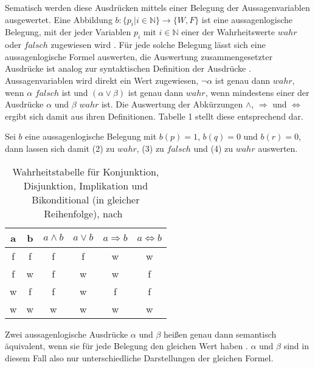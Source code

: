 \documentclass[conference,compsoc,final,a4paper]{IEEEtran}
\begin{document}
Sematisch werden diese Ausdrücken mittels einer Belegung der Aussagenvariablen ausgewertet. Eine Abbildung $b: \{ p_i | i \in \mathbb{N} \} \rightarrow \{ W,F \}$ ist eine aussagenlogische Belegung, mit der jeder Variablen $p_i$ mit $i \in \mathbb{N}$ einer der Wahrheitswerte $wahr$ oder $falsch$ zugewiesen wird \cite{logik_ebbinghaus}. Für jede solche Belegung lässt sich eine aussagenlogische Formel auswerten, die Auswertung zusammengesetzter Ausdrücke ist analog zur syntaktischen Definition der Ausdrücke \cite{aussagenlogik_rautenberg}. Aussagenvariablen wird direkt ein Wert zugewiesen, $\neg \alpha$ ist genau dann $wahr$, wenn $\alpha$ $falsch$ ist und $(\alpha \lor \beta)$ ist genau dann $wahr$, wenn mindestens einer der Ausdrücke $\alpha$ und $\beta$ $wahr$ ist. Die Auswertung der Abkürzungen $\land$, $\Rightarrow$ und $\Leftrightarrow$ ergibt sich damit aus ihren Definitionen. \cite{logik_ebbinghaus} Tabelle 1 stellt diese entsprechend dar.

Sei $b$ eine aussagenlogische Belegung mit $b(p) = 1$, $b(q) = 0$ und $b(r) = 0$, dann lassen sich damit (2) zu $wahr$, (3) zu $falsch$ und (4) zu $wahr$ auswerten.

\begin{table}[!ht]
\centering
\rmfamily
\caption{Wahrheitstabelle für Konjunktion, Disjunktion, Implikation und Bikonditional (in gleicher Reihenfolge), nach~\cite{aussagenlogik_rautenberg}}
\renewcommand{\arraystretch}{1.1}
\sffamily
\begin{footnotesize}
\begin{tabular}{| c | c | c | c | c | c |}
\toprule
\textbf{a} & \textbf{b} & \textbf{$a \land b$} & \textbf{$a \lor b$} & \textbf{$a \Rightarrow b$} & \textbf{$a \Leftrightarrow b$} \\
\midrule
f & f & f & f & w & w\\
f & w & f & w & w & f\\
w & f & f & w & f & f\\
w & w & w & w & w & w\\
\bottomrule
\end{tabular}
\end{footnotesize}
\label{google:numbers}
\end{table}

Zwei aussagenlogische Ausdrücke $\alpha$ und $\beta$ heißen genau dann semantisch äquivalent, wenn sie für jede Belegung den gleichen Wert haben \cite{aussagenlogik_rautenberg}. $\alpha$ und $\beta$ sind in diesem Fall also nur unterschiedliche Darstellungen der gleichen Formel.
\end{document}
